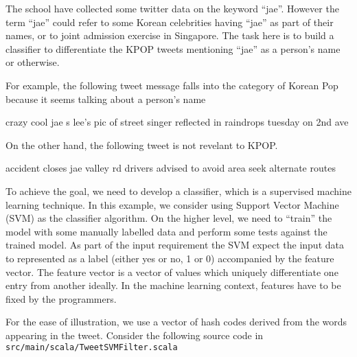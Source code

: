 \documentclass[10pt]{article}
\begin{document}
The school have collected some twitter data on the keyword ``jae''. 
However the term ``jae'' could refer to some 
Korean celebrities having ``jae'' as part of their names, or to joint
admission exercise in Singapore. 
The task here is to build a classifier to differentiate the KPOP tweets
mentioning ``jae'' as a person's name or otherwise.

For example, the following tweet message falls into the category of
Korean Pop because it seems talking about a person's name 
\begin{code}
crazy cool   jae s lee's pic of street singer reflected in raindrops
 tuesday on 2nd ave  
\end{code}
%
On the other hand, the following tweet is not revelant to KPOP. 
\begin{code}
accident closes jae valley rd drivers advised to avoid area seek 
alternate routes
\end{code}
%
To achieve the goal, we need to develop a classifier, which is a
supervised machine learning technique. In this example, we consider
using Support Vector Machine (SVM) as the classifier
algorithm. On the higher level, we need to ``train'' the model with
some manually labelled data and perform some tests against the trained
model. As part of the input requirement the SVM expect the input data
to represented as a label (either yes or no, 1 or 0) accompanied by
the feature vector. The feature vector is a vector of values which
uniquely differentiate one entry from another ideally.  In the machine
learning context, features have to be fixed by the programmers. 

For the ease of illustration, we use a vector of hash codes derived
from the words appearing in the tweet.  Consider the following source
code in \\ {\tt src/main/scala/TweetSVMFilter.scala} 
\end{document}
